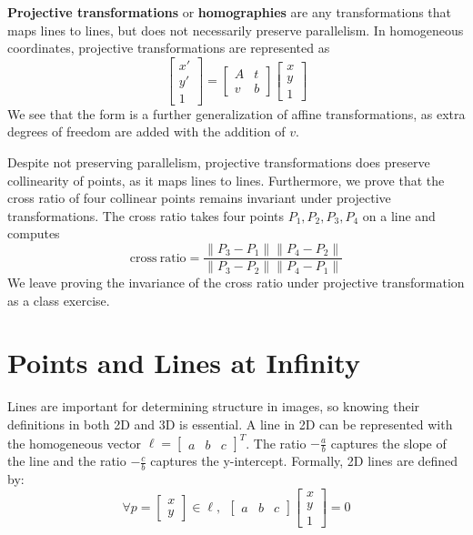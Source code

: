 \documentclass[a4paper, 12pt]{article}
\renewcommand\emph{\textbf}
\begin{document}
\emph{Projective transformations} or \emph{homographies} are any transformations that maps lines to lines, but does not necessarily preserve parallelism. In homogeneous coordinates, projective transformations are represented as
\begin{equation*}
    \begin{bmatrix}x'\\y'\\1\end{bmatrix} = \begin{bmatrix}A & t\\ v & b\end{bmatrix}\begin{bmatrix}x\\y\\1\end{bmatrix}
\end{equation*}
We see that the form is a further generalization of affine transformations, as extra degrees of freedom are added with the addition of $v$. 

Despite not preserving parallelism, projective transformations does preserve collinearity of points, as it maps lines to lines. Furthermore, we prove that the cross ratio of four collinear points remains invariant under projective transformations. The cross ratio takes four points $P_1, P_2, P_3, P_4$ on a line and computes
\begin{equation}
    \mathrm{cross\ ratio} = \frac{\|P_3-P_1\|\|P_4-P_2\|}{\|P_3-P_2\|\|P_4-P_1\|}
\end{equation}
We leave proving the invariance of the cross ratio under projective transformation as a class exercise.

\section{Points and Lines at Infinity}
Lines are important for determining structure in images, so knowing their definitions in both 2D and 3D is essential. A line in 2D can be represented with the homogeneous vector $\ell = \begin{bmatrix}a & b & c \end{bmatrix}^T$. The ratio $-\frac{a}{b}$ captures the slope of the line and the ratio $-\frac{c}{b}$ captures the y-intercept. Formally, 2D lines are defined by:
\begin{equation}
\forall p = \begin{bmatrix}x\\y\end{bmatrix} \in \ell,\ \  \begin{bmatrix}a & b & c\end{bmatrix}\begin{bmatrix}x\\y\\1\end{bmatrix} = 0
\end{equation}
\end{document}
